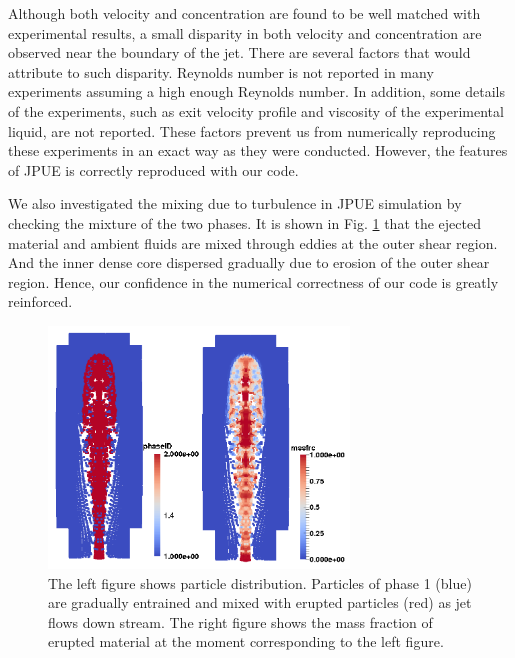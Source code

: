 \documentclass[journal abbreviation, manuscript]{copernicus}
\begin{document}
Although both velocity and concentration are found to be well matched with experimental results, a small disparity in both velocity and concentration are observed near the boundary of the jet. There are several factors that would attribute to such disparity. Reynolds number is not reported in many experiments assuming a high enough Reynolds number. In addition, some details of the experiments, such as exit velocity profile and viscosity of the experimental liquid, are not reported. These factors prevent us from numerically reproducing these experiments in an exact way as they were conducted. However, the features of JPUE is correctly reproduced with our code.

We also investigated the mixing due to turbulence in JPUE simulation by checking the mixture of the two phases. It is shown in Fig. \ref{fig:Turb_mixing} that the ejected material and ambient fluids are mixed through eddies at the outer shear region. And the inner dense core dispersed gradually due to erosion of the outer shear region. Hence, our confidence in the numerical correctness of our code  is greatly reinforced.

\begin{figure}
\includegraphics[width=8cm]{JPUE_entrainment.png}
\caption{The left figure shows particle distribution. Particles of phase 1 (blue) are gradually entrained and mixed with erupted particles (red) as jet flows down stream. The right figure shows the mass fraction of erupted material at the moment corresponding to the left figure.}
\label{fig:Turb_mixing}
\end{figure}
\end{document}
